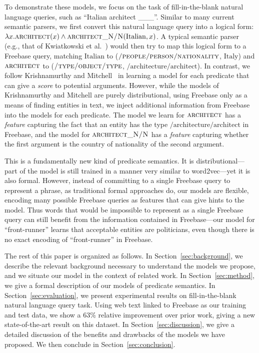 \documentclass[11pt]{article}
\newcommand{\secref}[1]{Section~\ref{sec:#1}}
\newcommand{\blank}{\_\_\_}
\newcommand{\predicate}[1]{\ensuremath{\textsc{#1}}}
\newcommand{\entity}[1]{\ensuremath{\mathrm{#1}}}
\begin{document}
To demonstrate these models, we focus on the task of fill-in-the-blank natural
language queries, such as ``Italian architect \blank{}''.  Similar to many
current semantic parsers, we first convert this natural language query into a
logical form: $\lambda x. \predicate{architect}(x) \land
\predicate{architect\_N/N}(\entity{Italian}, x)$.  A typical semantic
parser (e.g., that of Kwiatkowski et
al.~) would then try to map this
logical form to a Freebase query, matching \entity{Italian} to
(\predicate{/people/person/nationality}, \entity{Italy}) and
\predicate{architect} to (\predicate{/type/object/type},
\entity{/architecture/architect}).  In contrast, we follow Krishnamurthy and
Mitchell~ in learning a
model for each predicate that can give a \emph{score} to potential arguments.
However, while the models of Krishnamurthy and Mitchell are purely
distributional, using Freebase only as a means of finding entities in text, we
inject additional information from Freebase into the models for each predicate.
The model we learn for \predicate{architect} has a \emph{feature} capturing the
fact that an entity has the type \entity{/architecture/architect} in Freebase,
and the model for \predicate{architect\_N/N} has a \emph{feature} capturing
whether the first argument is the country of nationality of the second
argument.

This is a fundamentally new kind of predicate semantics.  It is
distributional---part of the model is still trained in a manner very similar to
word2vec---yet it is also formal.  However, instead of committing to a single
Freebase query to represent a phrase, as traditional formal approaches do, our
models are flexible, encoding many possible Freebase queries as features that
can give hints to the model.  Thus words that would be impossible to represent
as a single Freebase query can still benefit from the information contained in
Freebase---our model for ``front-runner'' learns that acceptable entities are
politicians, even though there is no exact encoding of ``front-runner'' in
Freebase.

The rest of this paper is organized as follows.  In \secref{background}, we
describe the relevant background necessary to understand the models we propose,
and we situate our model in the context of related work.  In \secref{method},
we give a formal description of our models of predicate semantics.  In
\secref{evaluation}, we present experimental results on fill-in-the-blank
natural language query task.  Using web text linked to Freebase as our training
and test data, we show a 63\% relative improvement over prior work, giving a
new state-of-the-art result on this dataset.  In \secref{discussion}, we give a
detailed discussion of the benefits and drawbacks of the models we have
proposed.  We then conclude in \secref{conclusion}.
\end{document}
